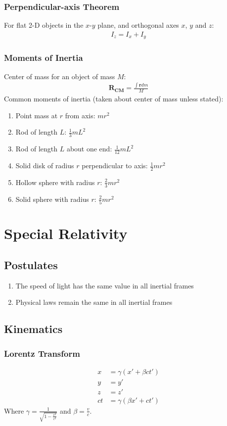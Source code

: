 \documentclass[11pt]{article}
\newcommand{\ve}[1]{\ensuremath{\bm{#1}}}			%
\begin{document}
\begin{multicols*}{3}
\subsubsection{Perpendicular-axis Theorem}
For flat 2-D objects in the $x$-$y$ plane, and orthogonal axes $x$, $y$ and $z$:
	\begin{align*}
	I_z=I_x+I_y
	\end{align*}
\subsubsection{Moments of Inertia}
Center of mass for an object of mass $M$:
	\begin{align*}
	\ve{R_\text{CM}}=\frac{\int\ve{r}dm}{M}
	\end{align*}
Common moments of inertia (taken about center of mass unless stated):
\begin{enumerate}
\setlength{\itemsep}{2mm}
\item Point mass at $r$ from axis: $mr^2$
\item Rod of length $L$: $\frac{1}{3}mL^2$
\item Rod of length $L$ about one end: $\frac{1}{12}mL^2$
\item Solid disk of radius $r$ perpendicular to axis: $\frac{1}{2}mr^2$
\item Hollow sphere with radius $r$: $\frac{2}{3}mr^2$
\item Solid sphere with radius $r$: $\frac{2}{5}mr^2$
\end{enumerate}
\section{Special Relativity}
\subsection{Postulates}
\begin{enumerate}
\item The speed of light has the same value in all inertial frames
\item Physical laws remain the same in all inertial frames
\end{enumerate}
\subsection{Kinematics}
\subsubsection{Lorentz Transform}
	\begin{align*}
	x&= \gamma (x' + \beta ct') \\
	y&=y' \\
	z&=z' \\
	ct&= \gamma (\beta x' + ct')
	\end{align*}
Where $\gamma = \frac{1}{\sqrt{1-\frac{v^2}{c^2}}}$ and $\beta = \frac{v}{c}$.

\end{multicols*}
\end{document}
